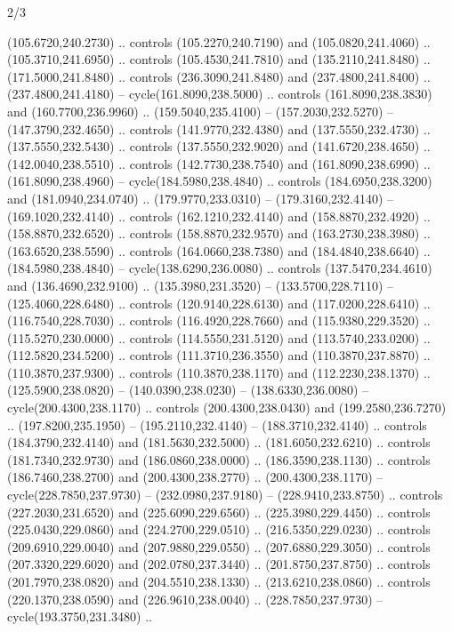 \begin{flagdescription}{2/3}
\begin{scope}[xshift=0.5\flaglength,yshift=0.5\flagwidth,scale=\stretchfactor]
\begin{scope}[scale=0.001645\flagwidth,yshift=65mm,xshift=-63mm]
\begin{scope}[y=0.80pt, x=0.80pt, yscale=-1,]
\begin{scope}[cm={{1.33333,0.0,0.0,1.33333,(0.0,1e-05)}}]
  (105.6720,240.2730) .. controls (105.2270,240.7190) and (105.0820,241.4060) ..
  (105.3710,241.6950) .. controls (105.4530,241.7810) and (135.2110,241.8480) ..
  (171.5000,241.8480) .. controls (236.3090,241.8480) and (237.4800,241.8400) ..
  (237.4800,241.4180) -- cycle(161.8090,238.5000) .. controls
  (161.8090,238.3830) and (160.7700,236.9960) .. (159.5040,235.4100) --
  (157.2030,232.5270) -- (147.3790,232.4650) .. controls (141.9770,232.4380) and
  (137.5550,232.4730) .. (137.5550,232.5430) .. controls (137.5550,232.9020) and
  (141.6720,238.4650) .. (142.0040,238.5510) .. controls (142.7730,238.7540) and
  (161.8090,238.6990) .. (161.8090,238.4960) -- cycle(184.5980,238.4840) ..
  controls (184.6950,238.3200) and (181.0940,234.0740) .. (179.9770,233.0310) --
  (179.3160,232.4140) -- (169.1020,232.4140) .. controls (162.1210,232.4140) and
  (158.8870,232.4920) .. (158.8870,232.6520) .. controls (158.8870,232.9570) and
  (163.2730,238.3980) .. (163.6520,238.5590) .. controls (164.0660,238.7380) and
  (184.4840,238.6640) .. (184.5980,238.4840) -- cycle(138.6290,236.0080) ..
  controls (137.5470,234.4610) and (136.4690,232.9100) .. (135.3980,231.3520) --
  (133.5700,228.7110) -- (125.4060,228.6480) .. controls (120.9140,228.6130) and
  (117.0200,228.6410) .. (116.7540,228.7030) .. controls (116.4920,228.7660) and
  (115.9380,229.3520) .. (115.5270,230.0000) .. controls (114.5550,231.5120) and
  (113.5740,233.0200) .. (112.5820,234.5200) .. controls (111.3710,236.3550) and
  (110.3870,237.8870) .. (110.3870,237.9300) .. controls (110.3870,238.1170) and
  (112.2230,238.1370) .. (125.5900,238.0820) -- (140.0390,238.0230) --
  (138.6330,236.0080) -- cycle(200.4300,238.1170) .. controls
  (200.4300,238.0430) and (199.2580,236.7270) .. (197.8200,235.1950) --
  (195.2110,232.4140) -- (188.3710,232.4140) .. controls (184.3790,232.4140) and
  (181.5630,232.5000) .. (181.6050,232.6210) .. controls (181.7340,232.9730) and
  (186.0860,238.0000) .. (186.3590,238.1130) .. controls (186.7460,238.2700) and
  (200.4300,238.2770) .. (200.4300,238.1170) -- cycle(228.7850,237.9730) --
  (232.0980,237.9180) -- (228.9410,233.8750) .. controls (227.2030,231.6520) and
  (225.6090,229.6560) .. (225.3980,229.4450) .. controls (225.0430,229.0860) and
  (224.2700,229.0510) .. (216.5350,229.0230) .. controls (209.6910,229.0040) and
  (207.9880,229.0550) .. (207.6880,229.3050) .. controls (207.3320,229.6020) and
  (202.0780,237.3440) .. (201.8750,237.8750) .. controls (201.7970,238.0820) and
  (204.5510,238.1330) .. (213.6210,238.0860) .. controls (220.1370,238.0590) and
  (226.9610,238.0040) .. (228.7850,237.9730) -- cycle(193.3750,231.3480) ..

\end{scope}
\end{scope}
\end{scope}
\end{scope}
\end{flagdescription}
